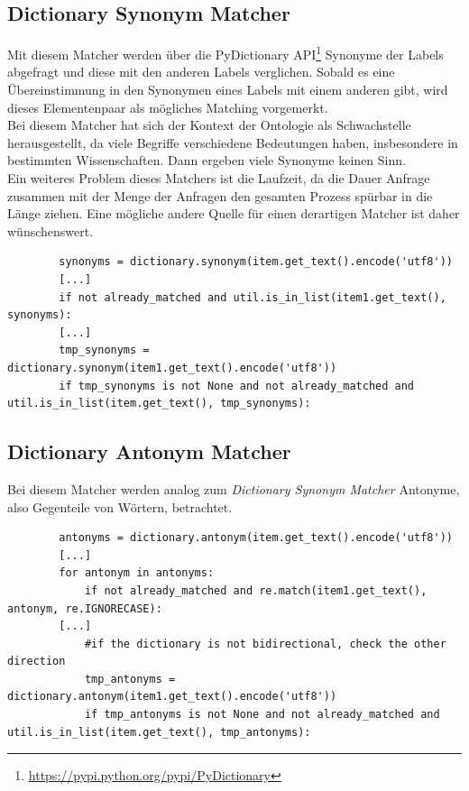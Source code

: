 		\subsection{Dictionary Synonym Matcher}
		Mit diesem Matcher werden über die PyDictionary
		API\footnote{\url{https://pypi.python.org/pypi/PyDictionary}} Synonyme der
		Labels abgefragt und diese mit den anderen Labels verglichen. Sobald es eine
		Übereinstimmung in den Synonymen eines Labels mit einem anderen gibt, wird
		dieses Elementenpaar als mögliches Matching vorgemerkt.\\
		Bei diesem Matcher hat sich der Kontext der Ontologie als Schwachstelle
		herausgestellt, da viele Begriffe verschiedene Bedeutungen haben, insbesondere
		in bestimmten Wissenschaften. Dann ergeben viele Synonyme keinen Sinn.\\
		Ein weiteres Problem dieses Matchers ist die Laufzeit, da die Dauer Anfrage
		zusammen mit der Menge der Anfragen den gesamten Prozess spürbar in die Länge
		ziehen. Eine mögliche andere Quelle für einen derartigen Matcher ist daher
		wünschenswert.
		\begin{lstlisting}
		synonyms = dictionary.synonym(item.get_text().encode('utf8'))
		[...]
		if not already_matched and util.is_in_list(item1.get_text(), synonyms):
		[...]
		tmp_synonyms = dictionary.synonym(item1.get_text().encode('utf8'))
		if tmp_synonyms is not None and not already_matched and	util.is_in_list(item.get_text(), tmp_synonyms):
		\end{lstlisting}
		
		\subsection{Dictionary Antonym Matcher}
		Bei diesem Matcher werden analog zum \textit{Dictionary Synonym Matcher}
		Antonyme, also Gegenteile von Wörtern, betrachtet.
		\begin{lstlisting}
		antonyms = dictionary.antonym(item.get_text().encode('utf8'))
		[...]
		for antonym in antonyms:
        	if not already_matched and re.match(item1.get_text(), antonym, re.IGNORECASE):
		[...]
		    #if the dictionary is not bidirectional, check the other direction
            tmp_antonyms = dictionary.antonym(item1.get_text().encode('utf8'))
            if tmp_antonyms is not None and not already_matched and util.is_in_list(item.get_text(), tmp_antonyms):
		\end{lstlisting}
		
